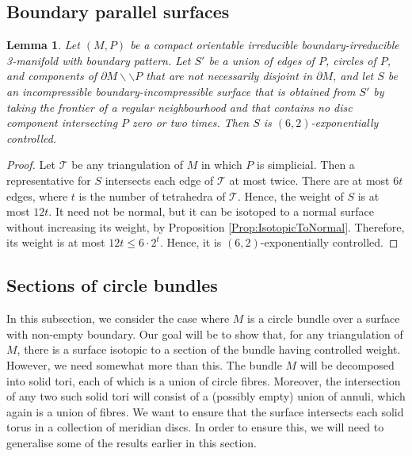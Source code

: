 \documentclass[oneside]{amsart}
\numberwithin{equation}{section}
\theoremstyle{plain}
\newtheorem{lemma}[equation]{Lemma}
\theoremstyle{definition}
\newcommand{\cut}{\backslash\backslash}
\begin{document}
\subsection{Boundary parallel surfaces}
\label{Subsec:BoundaryParallel}

\begin{lemma}
\label{Lem:BoundaryParallel}
Let $(M,P)$ be a compact orientable irreducible boundary-irreducible 3-manifold with boundary pattern. Let $S'$ be a union of edges of $P$, circles of $P$, and
components of
$\partial M \cut P$ that are not necessarily disjoint in $\partial M$, and let $S$ be an incompressible boundary-incompressible surface that is obtained from
$S'$ by taking the frontier of a regular neighbourhood and that contains no disc component intersecting $P$ zero or two times. 
Then $S$ is $(6,2)$-exponentially controlled.
\end{lemma}

\begin{proof}
Let $\mathcal{T}$ be any triangulation of $M$ in which $P$ is simplicial. Then a representative for $S$ intersects each edge of $\mathcal{T}$
at most twice. There are at most $6t$ edges, where $t$ is the number of tetrahedra of $\mathcal{T}$. Hence, the weight of $S$
is at most $12t$. It need not be normal, but it can be isotoped to a normal surface without increasing its weight, by Proposition \ref{Prop:IsotopicToNormal}.
Therefore, its weight is at most $12t \leq 6 \cdot 2^t$. Hence, it is $(6,2)$-exponentially controlled.
\end{proof}

\subsection{Sections of circle bundles}
\label{Sec:CircleBundle}

In this subsection, we consider the case where $M$ is a circle bundle over a surface with non-empty boundary. Our goal will be to show that, for any triangulation of $M$, there is a surface isotopic to a section of the bundle having controlled weight. However, we need somewhat more than this. The bundle $M$ will be decomposed into solid tori, each of which is a union of circle fibres. Moreover, the intersection of any two such solid tori will consist of a (possibly empty) union of annuli, which again is a union of fibres. We want to ensure that the surface intersects each solid torus in a collection of meridian discs. In order to ensure this, we will need to generalise some of the results earlier in this section.
\end{document}
